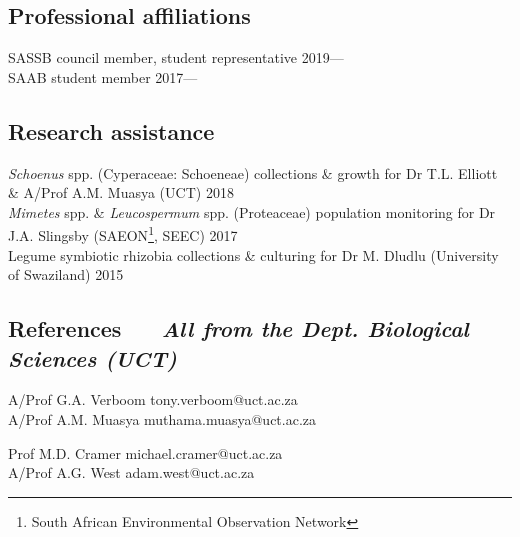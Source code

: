 \documentclass[10pt]{article}
\begin{document}
\begin{multicols}{2}

\subsection*{Professional affiliations} %

SASSB council member, student representative \hfill 2019--- \\
SAAB student member \hfill 2017---

\end{multicols}

\subsection*{Research assistance} %

\begin{hangparas}{2em}{1}

\textit{Schoenus} spp. (Cyperaceae: Schoeneae) collections \& growth for
  Dr T.L. Elliott \& A/Prof A.M. Muasya {\footnotesize (UCT)} \hfill 2018 \\
\textit{Mimetes} spp. \& \textit{Leucospermum} spp. (Proteaceae) population 
  monitoring for Dr J.A. Slingsby {\footnotesize (SAEON\footnote{South African 
  Environmental Observation Network}, SEEC)} \hfill 2017 \\
Legume symbiotic rhizobia collections \& culturing for Dr M. Dludlu 
  {\footnotesize (University of Swaziland)} \hfill 2015

\hfill

\end{hangparas}

\hrulefill

\subsection*{%
  References 
  ~~{\footnotesize \textmd{\textit{
    All from the Dept. Biological Sciences (UCT)
  }}}
}

\begin{multicols}{2}

A/Prof G.A. Verboom \hfill tony.verboom@uct.ac.za \\
A/Prof A.M. Muasya \hfill muthama.muasya@uct.ac.za

\columnbreak

Prof M.D. Cramer \hfill michael.cramer@uct.ac.za \\
A/Prof A.G. West \hfill adam.west@uct.ac.za      

\end{multicols}
\end{document}
